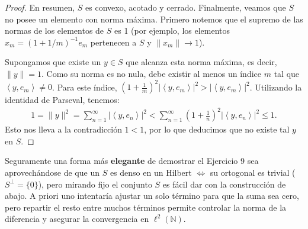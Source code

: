 \documentclass{article}
\theoremstyle{definition}
\newcommand{\N}{\mathbb{N}}
\newcommand{\ip}[2]{\left\langle #1, #2 \right\rangle}   %
\begin{document}
\begin{proof}
	En resumen, \( S \) es convexo, acotado y cerrado. Finalmente, veamos que \( S \) no posee un elemento con norma máxima. Primero notemos que el supremo de las normas de los elementos de \( S \) es 1 (por ejemplo, los elementos \( x_m = {(1 + 1/m)}^{-1} e_m \) pertenecen a \( S \) y \( \|x_m\| \to 1 \)).

	Supongamos que existe un \( y \in S \) que alcanza esta norma máxima, es decir, \( \|y\| = 1 \). Como su norma es no nula, debe existir al menos un índice \( m \) tal que \( \ip{y}{e_m} \neq 0 \). Para este índice, \( {\left( 1 + \frac{1}{m} \right)}^2 |\ip{y}{e_m}|^2 > |\ip{y}{e_m}|^2 \). Utilizando la identidad de Parseval, tenemos:
	\begin{align*}
		1 = \|y\|^2 = \sum_{n=1}^{\infty} | \ip{y}{e_n}|^2 < \sum_{n=1}^{\infty} {\left( 1 + \frac{1}{n} \right)}^2 | \ip{y}{e_n}|^2 \le 1.
	\end{align*}
	Esto nos lleva a la contradicción \( 1 < 1 \), por lo que deducimos que no existe tal \( y \) en \( S \).
\end{proof}

\vspace{0.5cm}

Seguramente una forma más \textbf{elegante} de demostrar el Ejercicio 9 sea aprovechándose de que un \( S \) es denso en un Hilbert \( \iff \) su ortogonal es trivial (\( S^\perp = \{0\} \)), pero mirando fijo el conjunto \( S \) es fácil dar con la construcción de abajo. A priori uno intentaría ajustar un solo término para que la suma sea cero, pero repartir el resto entre muchos términos permite controlar la norma de la diferencia y asegurar la convergencia en \( \ell^2(\N) \).
\end{document}
